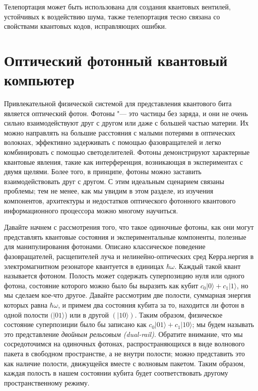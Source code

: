 \begin{multicols}{2}
{        Телепортация может быть использована для создания квантовых вентилей, устойчивых к воздействию шума, также телепортация тесно связана со свойствами квантовых
        кодов, исправляющих ошибки.
    }\\
    \section*{Оптический фотонный квантовый компьютер}
    \normalsize{
        Привлекательной физической системой для представления квантового бита является оптический фотон. Фотоны "--- это частицы без заряда, и они не очень сильно взаимодействуют друг с другом или даже
        с большей частью материи. Их можно направлять на большие расстояния с малыми потерями в оптических волокнах,
        эффективно задерживать с помощью фазовращателей и легко комбинировать с помощью светоделителей. Фотоны
        демонстрируют характерные квантовые явления, такие как интерференция, возникающая в экспериментах с двумя щелями. Более того, в принципе, фотоны можно заставить взаимодействовать друг с другом.
        С этим идеальным сценарием связаны проблемы; тем не менее,
        как мы увидим в этом разделе, из изучения компонентов, архитектуры и недостатков оптического фотонного квантового информационного процессора можно многому научиться.

        Давайте начнем с рассмотрения того, что такое одиночные фотоны, как они могут представлять квантовые
        состояния и экспериментальные компоненты, полезные для манипулирования фотонами. Описано классическое
        поведение фазовращателей, расщепителей луча и нелинейно-оптических сред Керра.нергия в электромагнитном резонаторе квантуется
        в единицах $\hbar\omega$. Каждый такой квант называется фотоном. Полость может 
        содержать суперпозицию нуля или одного фотона, состояние которого можно было бы выразить как кубит
        $c_0\vert0\rangle+c_1\vert1\rangle$, но мы сделаем кое-что другое. Давайте рассмотрим две полости,
        суммарная энергия которых равна $\hbar\omega$, и примем два состояния кубита за то, находится ли фотон в одной полости $(\vert01\rangle$) или в другой $(\vert10\rangle)$. 
        Таким образом, физическое состояние суперпозиции было
        бы записано как $c_0\vert01\rangle+c_1\vert10\rangle$; мы будем называть это представление \emph{двойным рельсовым (dual-rail)}. 
        Обратите внимание, что мы сосредоточимся на одиночных фотонах, распространяющихся в виде волнового пакета в свободном пространстве, а не
        внутри полости; можно представить это как наличие полости, движущейся вместе с волновым пакетом. Таким образом, каждая полость в нашем состоянии кубита будет соответствовать другому пространственному режиму.

}
\end{multicols}
